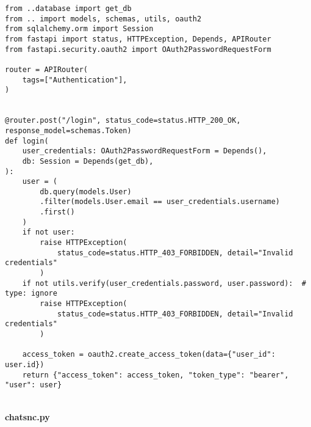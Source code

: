 \begin{Verbatim}[breaklines=true, breakanywhere=true]
from ..database import get_db
from .. import models, schemas, utils, oauth2
from sqlalchemy.orm import Session
from fastapi import status, HTTPException, Depends, APIRouter
from fastapi.security.oauth2 import OAuth2PasswordRequestForm

router = APIRouter(
    tags=["Authentication"],
)


@router.post("/login", status_code=status.HTTP_200_OK, response_model=schemas.Token)
def login(
    user_credentials: OAuth2PasswordRequestForm = Depends(),
    db: Session = Depends(get_db),
):
    user = (
        db.query(models.User)
        .filter(models.User.email == user_credentials.username)
        .first()
    )
    if not user:
        raise HTTPException(
            status_code=status.HTTP_403_FORBIDDEN, detail="Invalid credentials"
        )
    if not utils.verify(user_credentials.password, user.password):  # type: ignore
        raise HTTPException(
            status_code=status.HTTP_403_FORBIDDEN, detail="Invalid credentials"
        )

    access_token = oauth2.create_access_token(data={"user_id": user.id})
    return {"access_token": access_token, "token_type": "bearer", "user": user}

\end{Verbatim}
\
\\
\textbf{chatsnc.py}

